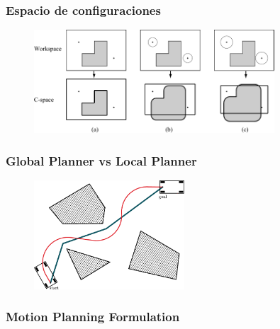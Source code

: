 \begin{frame}
	\frametitle{Espacio de configuraciones}
	
	\begin{figure}[!h]
		\includegraphics[width=0.8\textwidth]{images/workspace_configuration_space.pdf}
	\end{figure}
	
\end{frame}



\begin{frame}
	\frametitle{Global Planner vs Local Planner}
	
	\begin{figure}[!h]
		\includegraphics[width=0.5\textwidth]{images/global_local_plan.pdf}
	\end{figure}
	
\end{frame}

\begin{frame}
	\frametitle{Motion Planning Formulation}
	
\end{frame}


